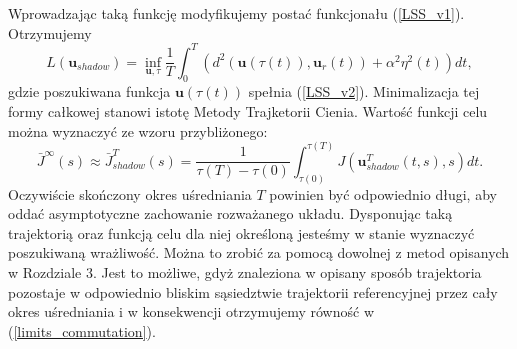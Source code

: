 \documentclass[12pt, twoside]{book}
\begin{document}
Wprowadzając taką funkcję modyfikujemy postać funkcjonału (\ref{LSS_v1}). Otrzymujemy
\begin{equation}
L(\textbf{u}_{shadow}) = \inf_{\textbf{u},\tau}\frac{1}{T}\int_{0}^{T}(d^{2}(\textbf{u}(\tau(t)),\textbf{u}_r(t)) + \alpha^{2}\eta^{2}(t))dt,
\label{LSS_v3}
\end{equation}
gdzie poszukiwana funkcja $ \textbf{u}(\tau(t)) $ spełnia (\ref{LSS_v2}). Minimalizacja tej formy całkowej stanowi istotę Metody Trajketorii Cienia.\newline
Wartość funkcji celu można wyznaczyć ze wzoru przybliżonego:
\begin{equation}
\bar{J}^{\infty}(s) \approx \bar{J}^{T}_{shadow}(s) = \frac{1}{\tau(T) - \tau(0)}\int_{\tau(0)}^{\tau(T)}J(\textbf{u}^{T}_{shadow}(t,s),s)dt.
\label{LSS_v4}
\end{equation}
Oczywiście skończony okres uśredniania $ T $ powinien być odpowiednio długi, aby oddać asymptotyczne zachowanie rozważanego układu. \newline
Dysponując taką trajektorią oraz funkcją celu dla niej określoną jesteśmy w stanie wyznaczyć poszukiwaną wrażliwość. Można to zrobić za pomocą dowolnej z metod opisanych w Rozdziale 3. Jest to możliwe, gdyż znaleziona w opisany sposób trajektoria pozostaje w odpowiednio bliskim sąsiedztwie trajektorii referencyjnej przez cały okres uśredniania i w konsekwencji otrzymujemy równość w (\ref{limits_commutation}).
\end{document}
